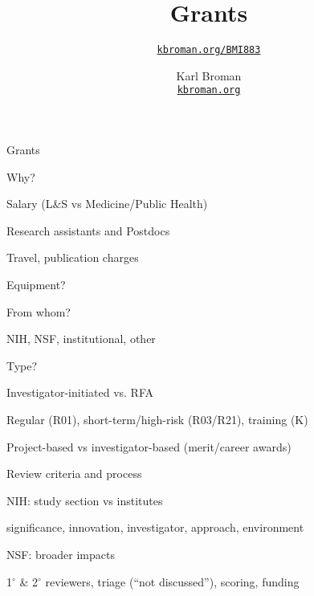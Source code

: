 \documentclass[aspectratio=169,12pt,t]{beamer}
\title{Grants}
\subtitle{}
\author{\href{https://kbroman.org/BMI883}{\tt kbroman.org/BMI883} }
\institute{}
\date{\small \hspace{3in} Karl Broman \\
  \hspace{3in} \href{https://kbroman.org}{\color{foreground}
    \small \tt kbroman.org}}
\begin{document}
\begin{frame}{Grants}

\bi
\item Why?
    \bi
    \item Salary (L\&S vs Medicine/Public Health)
    \item Research assistants and Postdocs
    \item Travel, publication charges
    \item Equipment?
    \ei
\item From whom?
    \bi
    \item NIH, NSF, institutional, other
    \ei
\item Type?
    \bi
    \item Investigator-initiated vs. RFA
    \item Regular (R01), short-term/high-risk (R03/R21), training (K)
    \item Project-based vs investigator-based (merit/career awards)
    \ei
\item Review criteria and process
    \bi
    \item NIH: study section vs institutes
    \item {\footnotesize significance, innovation, investigator, approach, environment}
    \item NSF: broader impacts
    \item 1$^{\circ}$ \& 2$^{\circ}$ reviewers, triage (``not discussed''), scoring, funding
    \ei
\ei

\end{frame}
\end{document}
